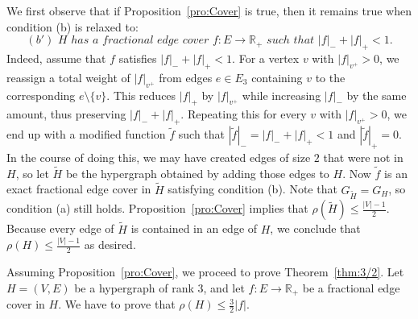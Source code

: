 \documentclass{article}
\theoremstyle{definition}
\begin{document}
We first observe that if Proposition~\ref{pro:Cover} is true, then it remains true when condition (b) is relaxed to: \[ (b')\,\, H\,\, has\,\, a\,\, fractional\,\, edge\,\, cover\,\,  f: E \to \mathbb{R}_+\,\,  such\,\, that\,\,  |f|_- + |f|_+ < 1.\] Indeed, assume that $f$ satisfies $|f|_- + |f|_+ < 1$. For a vertex $v$ with $|f|_{v^+} > 0$, we reassign a total weight of $|f|_{v^+}$ from edges $e \in E_3$ containing $v$ to the corresponding $e \setminus \{v\}$. This reduces $|f|_+$ by $|f|_{v^+}$ while increasing $|f|_-$ by the same amount, thus preserving $|f|_- + |f|_+$. Repeating this for every $v$ with $|f|_{v^+} > 0$, we end up with a modified function $\tilde{f}$ such that $|\tilde{f}|_- = |f|_- + |f|_+ < 1$ and $|\tilde{f}|_+ = 0$. In the course of doing this, we may have created edges of size $2$ that were not in $H$, so let $\tilde{H}$ be the hypergraph obtained by adding those edges to $H$. Now $\tilde{f}$ is an exact fractional edge cover in $\tilde{H}$ satisfying condition (b). Note that $G_{\tilde{H}} = G_H$, so condition (a) still holds. Proposition~\ref{pro:Cover} implies that $\rho(\tilde{H}) \le \frac{|V|-1}{2}$. Because every edge of $\tilde{H}$ is contained in an edge of $H$, we conclude that $\rho(H) \le \frac{|V|-1}{2}$ as desired.

Assuming Proposition~\ref{pro:Cover}, we proceed to prove Theorem~\ref{thm:3/2}. Let $H = (V, E)$ be a hypergraph of rank $3$, and let $f: E \to \mathbb{R}_+$ be a fractional edge cover in $H$. We have to prove that $\rho(H) \le \frac{3}{2} |f|$.
\end{document}
